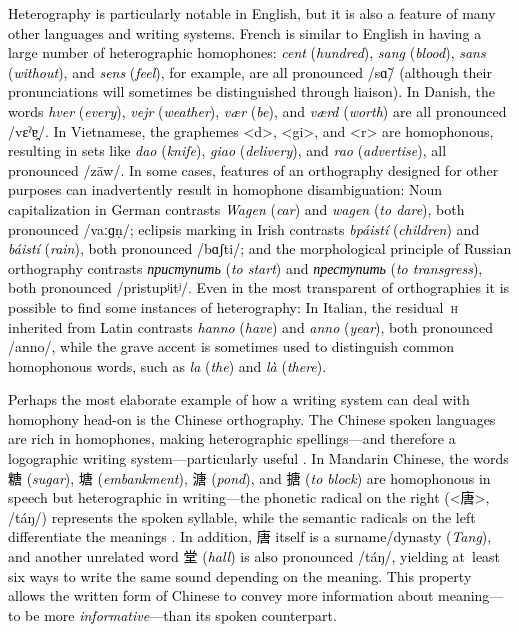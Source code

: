 \documentclass[doc,biblatex]{apa7}
\newcommand\firstrevision[1]{\textcolor{black}{#1}}
\begin{document}
\firstrevision{Heterography is particularly notable in English, but it is also a feature of many other languages and writing systems. French is similar to English in having a large number of heterographic homophones: \textit{cent} (\textit{hundred}), \textit{sang} (\textit{blood}), \textit{sans} (\textit{without}), and \textit{sens} (\textit{feel}), for example, are all pronounced /sɑ̃/ (although their pronunciations will sometimes be distinguished through liaison). In Danish, the words \textit{hver} (\textit{every}), \textit{vejr} (\textit{weather}), \textit{vær} (\textit{be}), and \textit{værd} (\textit{worth}) are all pronounced /vεˀɐ̯/. In Vietnamese, the graphemes <d>, <gi>, and <r> are homophonous, resulting in sets like \textit{dao} (\textit{knife}), \textit{giao} (\textit{delivery}), and \textit{rao} (\textit{advertise}), all pronounced /zāw/. In some cases, features of an orthography designed for other purposes can inadvertently result in homophone disambiguation: Noun capitalization in German contrasts \textit{Wagen} (\textit{car}) and \textit{wagen} (\textit{to dare}), both pronounced /vaːɡṇ/; eclipsis marking in Irish contrasts \textit{bpáistí} (\textit{children}) and \textit{báistí} (\textit{rain}), both pronounced /bɑʃti/; and the morphological principle of Russian orthography contrasts \textit{приступить} (\textit{to start}) and \textit{преступить} (\textit{to transgress}), both pronounced /pristupʲitʲ/. Even in the most transparent of orthographies it is possible to find some instances of heterography: In Italian, the residual~\textsc{h} inherited from Latin contrasts \textit{hanno} (\textit{have}) and \textit{anno} (\textit{year}), both pronounced /anno/, while the grave accent is sometimes used to distinguish common homophonous words, such as \textit{la} (\textit{the}) and \textit{là} (\textit{there}).}

\firstrevision{Perhaps the most elaborate example of how a writing system can deal with homophony head-on is the Chinese orthography. The Chinese spoken languages are rich in homophones, making heterographic spellings---and therefore a logographic writing system---particularly useful \parencite{Frost:2012}. In Mandarin Chinese, the words 糖 (\textit{sugar}), 塘 (\textit{embankment}), 溏 (\textit{pond}), and 搪 (\textit{to block}) are homophonous in speech but heterographic in writing---the phonetic radical on the right (<唐>, /táŋ/) represents the spoken syllable, while the semantic radicals on the left differentiate the meanings \parencite[p.~101]{Coulmas:1991}. In addition, 唐 itself is a surname/dynasty (\textit{Tang}), and another unrelated word 堂 (\textit{hall}) is also pronounced /táŋ/, yielding at~least six ways to write the same sound depending on the meaning. This property allows the written form of Chinese to convey more information about meaning---to be more \textit{informative}---than its spoken counterpart.}
\end{document}
